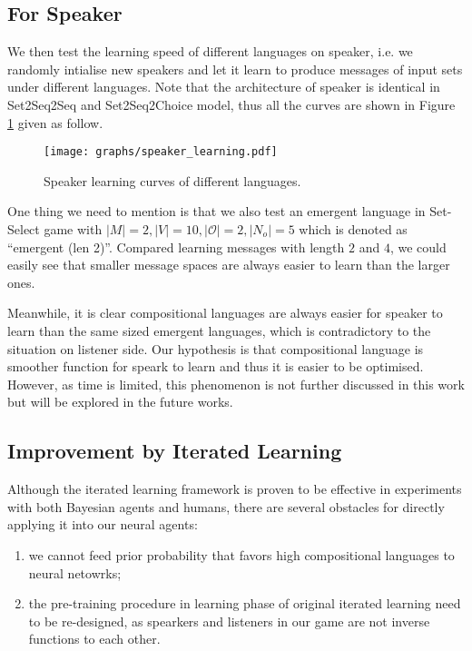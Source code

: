 \subsection{For Speaker}
\label{ssec4.3.2:learning_speaker}

We then test the learning speed of different languages on speaker, i.e. we randomly intialise new speakers and let it learn to produce messages of input sets under different languages. Note that the architecture of speaker is identical in Set2Seq2Seq and Set2Seq2Choice model, thus all the curves are shown in Figure \ref{fig4.3:speaker_learning} given as follow.

\begin{figure}[!h]
    \centering
    \texttt{[image: graphs/speaker\_learning.pdf]}
    \caption{Speaker learning curves of different languages.}
    \label{fig4.3:speaker_learning}
\end{figure}

One thing we need to mention is that we also test an emergent language in Set-Select game with $|M|=2, |V|=10, |\mathcal{O}|=2, |N_o|=5$ which is denoted as ``emergent (len 2)''. Compared learning messages with length $2$ and $4$, we could easily see that smaller message spaces are always easier to learn than the larger ones.

Meanwhile, it is clear compositional languages are always easier for speaker to learn than the same sized emergent languages, which is contradictory to the situation on listener side. Our hypothesis is that compositional language is smoother function for speark to learn and thus it is easier to be optimised. However, as time is limited, this phenomenon is not further discussed in this work but will be explored in the future works.

\subsection{Improvement by Iterated Learning}
\label{ssec4.3.:iterated_learning_improve}

Although the iterated learning framework \cite{kirby2002emergence} is proven to be effective in experiments with both Bayesian agents and humans, there are several obstacles for directly applying it into our neural agents:

\begin{enumerate}
    \item we cannot feed prior probability that favors high compositional languages to neural netowrks;
    \item the pre-training procedure in learning phase of original iterated learning need to be re-designed, as spearkers and listeners in our game are not inverse functions to each other.
\end{enumerate}

